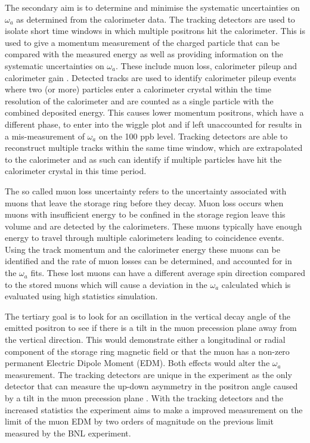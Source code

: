 The secondary aim is to determine and minimise the systematic uncertainties on $\omega_{a}$ as determined from the calorimeter data. The tracking detectors are used to isolate short time windows in which multiple positrons hit the calorimeter. This is used to give a momentum measurement of the charged particle that can be compared with the measured energy as well as providing information on the systematic uncertainties on $\omega_{a}$. These include muon loss, calorimeter pileup and calorimeter gain \cite{Reference29}. Detected tracks are used to identify calorimeter pileup events where two (or more) particles enter a calorimeter crystal within the time resolution of the calorimeter and are counted as a single particle with the combined deposited energy. This causes lower momentum positrons, which have a different phase, to enter into the wiggle plot and if left unaccounted for results in a mis-measurement of $\omega_{a}$ on the 100 ppb level. Tracking detectors are able to reconstruct multiple tracks within the same time window, which are extrapolated to the calorimeter and as such can identify if multiple particles have hit the calorimeter crystal in this time period. 

The so called muon loss uncertainty refers to the uncertainty associated with muons that leave the storage ring before they decay. Muon loss occurs when muons with insufficient energy to be confined in the storage region leave this volume and are detected by the calorimeters. These muons typically have enough energy to travel through multiple calorimeters leading to coincidence events. Using the track momentum and the calorimeter energy these muons can be identified and the rate of muon losses can be determined, and accounted for in the $\omega_{a}$ fits. These lost muons can have a different average spin direction compared to the stored muons which will cause a deviation in the $\omega_{a}$ calculated which is evaluated using high statistics simulation.

The tertiary goal is to look for an oscillation in the vertical decay angle of the emitted positron to see if there is a tilt in the muon precession plane away from the vertical direction. This would demonstrate either a longitudinal or radial component of the storage ring magnetic field or that the muon has a non-zero permanent Electric Dipole Moment (EDM). Both effects would alter the $\omega_{a}$ measurement. The tracking detectors are unique in the experiment as the only detector that can measure the up-down asymmetry in the positron angle caused by a tilt in the muon precession plane \cite{Reference29}. With the tracking detectors and the increased statistics the experiment aims to make a improved measurement on the limit of the muon EDM by two orders of magnitude on the previous limit measured by the BNL experiment.

